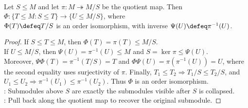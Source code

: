 \begin{theorem} \label{thm:module-correspondence-theorem} \\
Let $S\leq M$ and let $\pi:M\twoheadrightarrow M/S$ be the quotient map. Then $\Phi:\{T\leq M:S\leq T\}\longrightarrow\{U\leq M/S\}$, where\\
$\Phi(T)\defeq T/S$ is an order isomorphism, with inverse $\Psi(U)\defeq\pi^{-1}(U)$.
\begin{proof} If $S\leq T\leq M$, then $\Phi(T)=\pi(T)\leq M/S$.\\
If $U\leq M/S$, then $\Psi(U)=\pi^{-1}(U)\leq M$ and $S=\ker\pi\leq\Psi(U)$.\\
Moreover, $\Psi\Phi(T)=\pi^{-1}(T/S)=T$ and $\Phi\Psi(U)=\pi(\pi^{-1}(U))=U$, where the second equality uses surjectivity of $\pi$. Finally, $T_1\leq T_2\Longrightarrow T_1/S\leq T_2/S$, and $U_1\leq U_2\Longrightarrow \pi^{-1}(U_1)\leq \pi^{-1}(U_2)$. Thus $\Phi$ is an order isomorphism.\\
: Submodules above $S$ are exactly the submodules visible after $S$ is collapsed.\\
: Pull back along the quotient map to recover the original submodule.
\end{proof}
\end{theorem}

